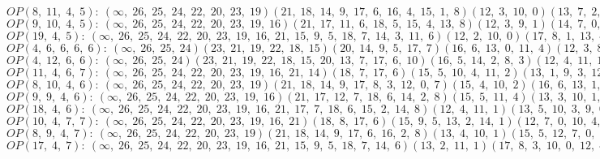 $OP(8, \;11, \;4, \;5): \:(\infty, \;26, \;25, \;24, \;22, \;20, \;23, \;19)(21, \;18, \;14, \;9, \;17, \;6, \;16, \;4, \;15, \;1, \;8)(12, \;3, \;10, \;0)(13, \;7, \;2, \;11, \;5)$\\
$OP(9, \;10, \;4, \;5): \:(\infty, \;26, \;25, \;24, \;22, \;20, \;23, \;19, \;16)(21, \;17, \;11, \;6, \;18, \;5, \;15, \;4, \;13, \;8)(12, \;3, \;9, \;1)(14, \;7, \;0, \;10, \;2)$\\
$OP(19, \;4, \;5): \:(\infty, \;26, \;25, \;24, \;22, \;20, \;23, \;19, \;16, \;21, \;15, \;9, \;5, \;18, \;7, \;14, \;3, \;11, \;6)(12, \;2, \;10, \;0)(17, \;8, \;1, \;13, \;4)$\\
$OP(4, \;6, \;6, \;6, \;6): \:(\infty, \;26, \;25, \;24)(23, \;21, \;19, \;22, \;18, \;15)(20, \;14, \;9, \;5, \;17, \;7)(16, \;6, \;13, \;0, \;11, \;4)(12, \;3, \;8, \;2, \;10, \;1)$\\
$OP(4, \;12, \;6, \;6): \:(\infty, \;26, \;25, \;24)(23, \;21, \;19, \;22, \;18, \;15, \;20, \;13, \;7, \;17, \;6, \;10)(16, \;5, \;14, \;2, \;8, \;3)(12, \;4, \;11, \;1, \;9, \;0)$\\
$OP(11, \;4, \;6, \;7): \:(\infty, \;26, \;25, \;24, \;22, \;20, \;23, \;19, \;16, \;21, \;14)(18, \;7, \;17, \;6)(15, \;5, \;10, \;4, \;11, \;2)(13, \;1, \;9, \;3, \;12, \;8, \;0)$\\
$OP(8, \;10, \;4, \;6): \:(\infty, \;26, \;25, \;24, \;22, \;20, \;23, \;19)(21, \;18, \;14, \;9, \;17, \;8, \;3, \;12, \;0, \;7)(15, \;4, \;10, \;2)(16, \;6, \;13, \;1, \;11, \;5)$\\
$OP(9, \;9, \;4, \;6): \:(\infty, \;26, \;25, \;24, \;22, \;20, \;23, \;19, \;16)(21, \;17, \;12, \;7, \;18, \;6, \;14, \;2, \;8)(15, \;5, \;11, \;4)(13, \;3, \;10, \;1, \;9, \;0)$\\
$OP(18, \;4, \;6): \:(\infty, \;26, \;25, \;24, \;22, \;20, \;23, \;19, \;16, \;21, \;17, \;7, \;18, \;6, \;15, \;2, \;14, \;8)(12, \;4, \;11, \;1)(13, \;5, \;10, \;3, \;9, \;0)$\\
$OP(10, \;4, \;7, \;7): \:(\infty, \;26, \;25, \;24, \;22, \;20, \;23, \;19, \;16, \;21)(18, \;8, \;17, \;6)(15, \;9, \;5, \;13, \;2, \;14, \;1)(12, \;7, \;0, \;10, \;4, \;11, \;3)$\\
$OP(8, \;9, \;4, \;7): \:(\infty, \;26, \;25, \;24, \;22, \;20, \;23, \;19)(21, \;18, \;14, \;9, \;17, \;6, \;16, \;2, \;8)(13, \;4, \;10, \;1)(15, \;5, \;12, \;7, \;0, \;11, \;3)$\\
$OP(17, \;4, \;7): \:(\infty, \;26, \;25, \;24, \;22, \;20, \;23, \;19, \;16, \;21, \;15, \;9, \;5, \;18, \;7, \;14, \;6)(13, \;2, \;11, \;1)(17, \;8, \;3, \;10, \;0, \;12, \;4)$\\
